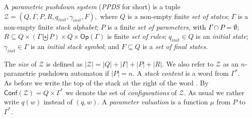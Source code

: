 \documentclass[a4paper,UKenglish,cleveref, autoref, thm-restate]{lipics-v2021}
\newcommand{\Conf}{\mathsf{Conf}}
\newcommand{\Op}{\mathsf{Op}}
\begin{document}
\par\noindent\ignorespacesafterend
A {\em parametric pushdown system} ({\em PPDS} for short) 
is a tuple $\mathcal{Z} = (Q, \Gamma, P, R, q_{init},\gamma_{init}, F),$ where
 $Q$ is a non-empty finite {\em set of  states};
 $\Gamma$ is a non-empty finite {\em  stack alphabet};
 $P$ is a finite {\em   set of parameters}, \textcolor{black}{with $\Gamma \cap P = \emptyset$};
  $R   \subseteq  Q  \times (\Gamma \biguplus P)  \times Q  \times \Op(\Gamma)$ is finite {\em  set of rules};
 $q_{init}\in Q$ is an {\em initial  state};
 $ \gamma_{init} \in \Gamma$ is an {\em initial stack symbol}; and
 $F\subseteq Q$ is a {\em set of final  states}.


The {\em size} of $\mathcal{Z}$ is defined as
$|\mathcal{Z}| = |Q| + |\Gamma| + |P| + |R| $.
We also refer to $\mathcal{Z}$ as an $n$-parametric pushdown automaton if $|P| = n$.
A {\em stack content} is a word from $ \Gamma^*$. 
As before we write the top
of the stack at the right of the word%
. 
By $\Conf(\mathcal{Z})=Q\times  \Gamma^*$ we denote the set of
{\em configurations} of $\mathcal{Z}$. As usual we rather write $q(w)$ instead of $(q, w)$.
A {\em parameter valuation} is a function $\mu$ from $P$ to $\Gamma^*$.
\end{document}
